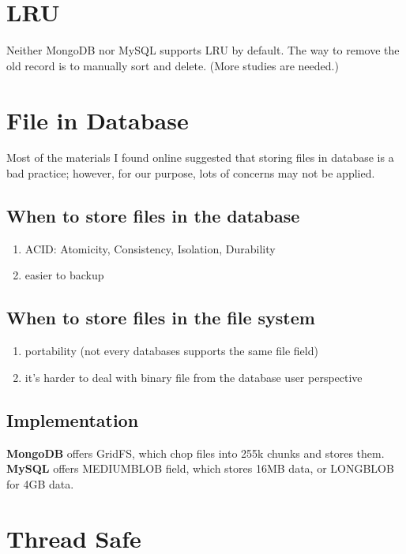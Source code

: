 \documentclass[letterpaper, 10 pt, conference]{ieeeconf}
\begin{document}
\section{LRU}

Neither MongoDB nor MySQL supports LRU by default. The way to remove the old record is to manually sort and delete. (More studies are needed.)

\section{File in Database}

Most of the materials I found online suggested that storing files in database is a bad practice; however, for our purpose, lots of concerns may not be applied. \cite{file-database}

\subsection{When to store files in the database}

\begin{enumerate}
    \item ACID: Atomicity, Consistency, Isolation, Durability
    \item easier to backup
\end{enumerate}

\subsection{When to store files in the file system}

\begin{enumerate}
    \item portability (not every databases supports the same file field)
    \item it's harder to deal with binary file from the database user perspective
\end{enumerate}

\subsection{Implementation}

{\bf MongoDB} offers GridFS, which chop files into 255k chunks and stores them. {\bf MySQL} offers MEDIUMBLOB field, which stores 16MB data, or LONGBLOB for 4GB data.

\section{Thread Safe}
\end{document}

